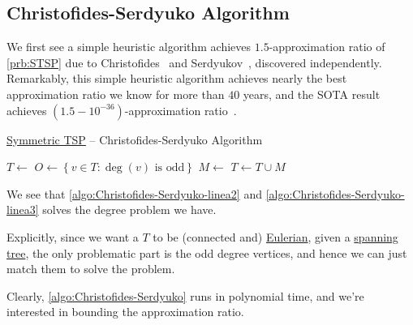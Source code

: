 \subsection{Christofides-Serdyuko Algorithm}
We first see a simple heuristic algorithm achieves \(1.5\)-approximation ratio of \autoref{prb:STSP} due to Christofides~\cite{Christofides2022WorstCaseAO} and Serdyukov~\cite{Anatoliy}, discovered independently. Remarkably, this simple heuristic algorithm achieves nearly the best approximation ratio we know for more than \(40\) years, and the SOTA result achieves \((1.5-10^{-36})\)-approximation ratio~\cite{10.1145/3406325.3451009}.

\begin{algorithm}[H]\label{algo:Christofides-Serdyuko}
	\DontPrintSemicolon
	\caption{\hyperref[prb:STSP]{Symmetric TSP} -- Christofides-Serdyuko Algorithm~\cite{Christofides2022WorstCaseAO,Anatoliy}}
	\BlankLine
	\(T \gets\)\label{algo:Christofides-Serdyuko-linea1}
	\(O\gets \left\{ v\in T \colon \deg(v)\text{ is odd}\right\} \)\label{algo:Christofides-Serdyuko-linea2}\;
	\(M\gets\)\label{algo:Christofides-Serdyuko-linea3}
	\(T\gets T \cup M\)\;
	\;
\end{algorithm}

\begin{remark}
	We see that \autoref{algo:Christofides-Serdyuko-linea2} and \autoref{algo:Christofides-Serdyuko-linea3} solves the degree problem we have.
\end{remark}
\begin{explanation}
	Explicitly, since we want a \(T\) to be (connected and) \href{https://en.wikipedia.org/wiki/Eulerian_path}{Eulerian}, given a \hyperref[def:spanning-tree]{spanning tree}, the only problematic part is the odd degree vertices, and hence we can just match them to solve the problem.
\end{explanation}

Clearly, \autoref{algo:Christofides-Serdyuko} runs in polynomial time, and we're interested in bounding the approximation ratio.

